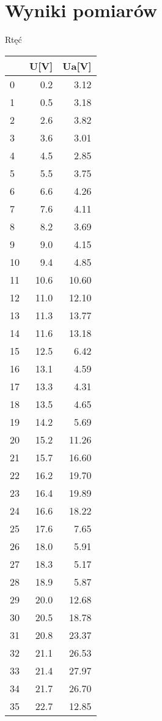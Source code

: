 \documentclass[a4paper,10pt]{article}
\begin{document}
\section{Wyniki pomiarów}
Rtęć
\begin{tabular}{lrr}
\toprule
{} &  U[V] &  Ua[V] \\
\midrule
0  &   0.2 &   3.12 \\
1  &   0.5 &   3.18 \\
2  &   2.6 &   3.82 \\
3  &   3.6 &   3.01 \\
4  &   4.5 &   2.85 \\
5  &   5.5 &   3.75 \\
6  &   6.6 &   4.26 \\
7  &   7.6 &   4.11 \\
8  &   8.2 &   3.69 \\
9  &   9.0 &   4.15 \\
10 &   9.4 &   4.85 \\
11 &  10.6 &  10.60 \\
12 &  11.0 &  12.10 \\
13 &  11.3 &  13.77 \\
14 &  11.6 &  13.18 \\
15 &  12.5 &   6.42 \\
16 &  13.1 &   4.59 \\
17 &  13.3 &   4.31 \\
18 &  13.5 &   4.65 \\
19 &  14.2 &   5.69 \\
20 &  15.2 &  11.26 \\
21 &  15.7 &  16.60 \\
22 &  16.2 &  19.70 \\
23 &  16.4 &  19.89 \\
24 &  16.6 &  18.22 \\
25 &  17.6 &   7.65 \\
26 &  18.0 &   5.91 \\
27 &  18.3 &   5.17 \\
28 &  18.9 &   5.87 \\
29 &  20.0 &  12.68 \\
30 &  20.5 &  18.78 \\
31 &  20.8 &  23.37 \\
32 &  21.1 &  26.53 \\
33 &  21.4 &  27.97 \\
34 &  21.7 &  26.70 \\
35 &  22.7 &  12.85 \\

\end{tabular}
\end{document}

